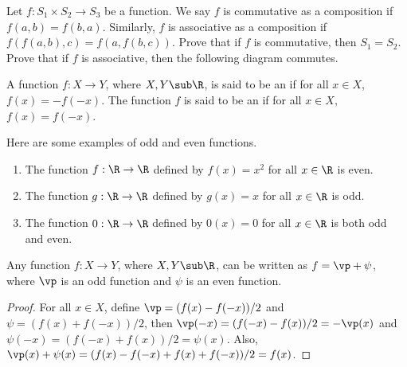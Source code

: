 \documentclass[10pt]{article}
\begin{document}
\begin{problem}
    Let $f:{S}_{1}\times{S}_{2}\to{S}_{3}$ be a function. We say $f$ is commutative as a composition if $f(a,b)=f(b,a)$. Similarly, $f$ is associative as a composition if $f(f(a,b),c)=f(a,f(b,c))$. Prove that if $f$ is commutative, then ${S}_{1}={S}_{2}$. Prove that if $f$ is associative, then the following diagram commutes.
    \begin{center}
    \end{center}
\end{problem}
\begin{definition}
    A function $f:X\to Y$, where $X,Y\sub\R$, is said to be an  if for all $x\in X$, $f(x)=-f(-x)$. The function $f$ is said to be an  if for all $x\in X$, $f(x)=f(-x)$. 
\end{definition}
\begin{example}
    Here are some examples of odd and even functions.
    \begin{enumerate}
        \item The function $f:\R\to\R$ defined by $f(x)={x}^{2}$ for all $x\in\R$ is even.
        \item The function $g:\R\to\R$ defined by $g(x)=x$ for all $x\in\R$ is odd.
        \item The function $0:\R\to\R$ defined by $0(x)=0$ for all $x\in\R$ is both odd and even.
    \end{enumerate}
\end{example}
\begin{proposition}
    Any function $f:X\to Y$, where $X,Y\sub\R$, can be written as $f=\vp+\psi$, where $\vp$ is an odd function and $\psi$ is an even function.
\end{proposition}
\begin{proof}
    For all $x\in X$, define $\vp=(f(x)-f(-x))/2$ and $\psi=(f(x)+f(-x))/2$, then $\vp(-x)=(f(-x)-f(x))/2=-\vp(x)$ and $\psi(-x)=(f(-x)+f(x))/2=\psi(x)$. Also, $\vp(x)+\psi(x)=(f(x)-f(-x)+f(x)+f(-x))/2=f(x)$.
\end{proof}
\end{document}
